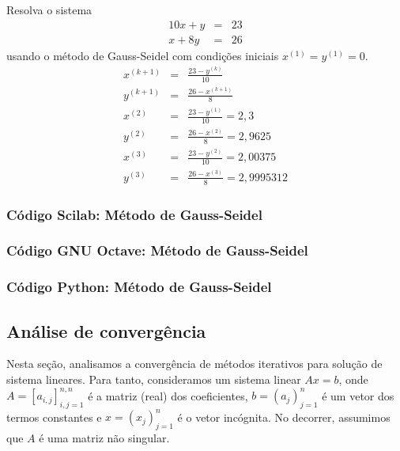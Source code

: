 \begin{ex}
Resolva o sistema
\begin{eqnarray*}
  10x+y&=&23\\
  x+8y&=&26
\end{eqnarray*}
usando o método de Gauss-Seidel com condições iniciais $x^{(1)}=y^{(1)}=0$.
\begin{eqnarray*}
x^{(k+1)}&=&\frac{23-y^{(k)}}{10}\\
y^{(k+1)}&=&\frac{26-x^{(k+1)}}{8}\\
x^{(2)}&=&\frac{23-y^{(1)}}{10}=2,3\\
y^{(2)}&=&\frac{26-x^{(2)}}{8}=2,9625\\
x^{(3)}&=&\frac{23-y^{(2)}}{10}=2,00375  \\
y^{(3)}&=&\frac{26-x^{(3)}}{8}=2,9995312
\end{eqnarray*}
\end{ex}

\ifisscilab
\subsubsection{Código Scilab: Método de Gauss-Seidel}


\fi
\ifisoctave
\subsubsection{Código GNU Octave: Método de Gauss-Seidel}


\fi
\ifispython
\subsubsection{Código Python: Método de Gauss-Seidel}


\fi

\subsection{Análise de convergência}

Nesta seção, analisamos a convergência de métodos iterativos para solução de sistema lineares. Para tanto, consideramos um sistema linear $Ax = b$, onde $A = [a_{i,j}]_{i,j=1}^{n,n}$ é a matriz (real) dos coeficientes, $b = (a_j)_{j=1}^n$ é um vetor dos termos constantes e $x = (x_j)_{j=1}^n$ é o vetor incógnita. No decorrer, assumimos que $A$ é uma matriz não singular.

